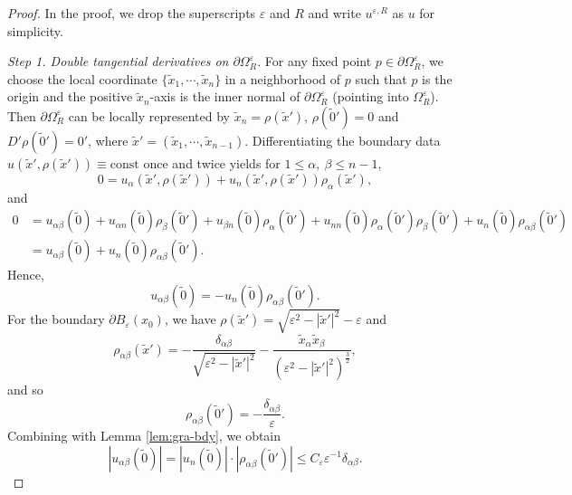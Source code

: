 \documentclass[reqno]{amsart}
\theoremstyle{remark}
\theoremstyle{definition}
\numberwithin{equation}{section}
\begin{document}
\begin{proof} 
	In the proof, we drop the superscripts $\varepsilon$ and $R$ and write $u^{\varepsilon,R}$ as $u$ for simplicity.

\textit{Step 1. Double tangential derivatives on $\partial\Omega_R^\varepsilon$.} For any fixed point $p\in\partial\Omega_R^\varepsilon$, we choose the local coordinate $\{\tilde{x}_1,\cdots,\tilde{x}_n\}$ in a neighborhood of $p$ such that $p$ is the origin and the positive $\tilde{x}_n$-axis is the inner normal of $\partial\Omega_R^\varepsilon$ (pointing into $\Omega_R^\varepsilon$). Then
$\partial  \Omega_R^\varepsilon$ can be locally represented by $\tilde{x}_n=\rho(\tilde{x}')$, $\rho(\tilde{0}')=0$ and $D'\rho(\tilde{0}')=0'$, where $\tilde{x}'=(\tilde x_1,\cdots,\tilde x_{n-1})$. Differentiating the boundary data $u(\tilde{x}',\rho(\tilde{x}'))\equiv\text{const}$ once and twice yields for $1\leq \alpha,\ \beta\leq n-1$,
\begin{equation}\label{eq:tan-d1}
0 = u_{\alpha}(\tilde{x}', \rho(\tilde{x}')) + u_n(\tilde{x}', \rho(\tilde{x}')) \rho_\alpha(\tilde{x}'),
\end{equation}
and
\[
\begin{aligned}
0 &= u_{\alpha\beta}(\tilde 0) + u_{\alpha n}(\tilde 0) \rho_\beta(\tilde 0') + u_{\beta n}(\tilde 0) \rho_\alpha(\tilde 0') + u_{nn}(\tilde 0) \rho_\alpha(\tilde 0') \rho_\beta(\tilde{0}') + u_n(\tilde 0) \rho_{\alpha\beta}(\tilde{0}') \\
&= u_{\alpha\beta}(\tilde 0) + u_n(\tilde 0)\rho_{\alpha\beta}(\tilde 0').
\end{aligned}
\]
Hence,  
\begin{equation}\label{eq:TT-I}
	u_{\alpha\beta}(\tilde 0) = -u_n(\tilde 0) \rho_{\alpha\beta}(\tilde 0').
\end{equation}
For the boundary \(\partial B_\varepsilon(x_0)\), we have \(\rho(\tilde{x}') = \sqrt{\varepsilon^2 - |\tilde{x}'|^2}-\varepsilon \) and
\[
\rho_{\alpha\beta}(\tilde{x}') = -\frac{\delta_{\alpha\beta}}{\sqrt{\varepsilon^2 - |\tilde{x}'|^2}} -\frac{\tilde x_\alpha \tilde x_\beta}{(\varepsilon^2 - |\tilde{x}'|^2)^{\frac{3}{2}}},
\]
and so 
\begin{equation}\label{eq:rho-11}
	\rho_{\alpha\beta}(\tilde 0') = -\frac{\delta_{\alpha\beta}}{\varepsilon}.
\end{equation}
Combining with Lemma \ref{lem:gra-bdy}, we obtain
\begin{equation*}
|u_{\alpha\beta}(\tilde 0)| = |u_n(\tilde 0)| \cdot |\rho_{\alpha\beta}(\tilde 0')| \leq C_\varepsilon\varepsilon^{-1} \delta_{\alpha\beta}.

\end{equation*}
\end{proof}
\end{document}
